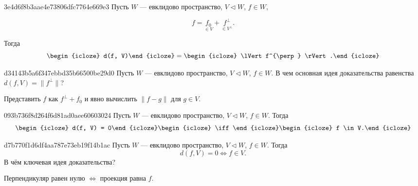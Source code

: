 \begin{note}{3e4d6f8b3aae4e73806dfc7764e669e3}
    Пусть \({ W }\) --- евклидово пространство, \({ V \triangleleft W }\), \({ f \in W }\),
    \begin{icloze}{3}
        \[
            f = \underset{\in V}{f_0} + \underset{\in V^{\perp}}{f^{\perp}}.
        \]
    \end{icloze}
    Тогда
    \[
        \begin{icloze}{2}d(f, V)\end{icloze} = \begin{icloze}{1}\lVert f^{\perp} \rVert.\end{icloze}
    \]
\end{note}

\begin{note}{d34143b5a6f347ebbd35b66500be29d0}
    Пусть \({ W }\) --- евклидово пространство, \({ V \triangleleft W }\), \({ f \in W }\).
    В чем  основная идея доказательства равенства \({ d(f, V) = \lVert f^{\perp} \rVert }\)?

    \begin{cloze}{1}
        Представить \({ f }\) как \({ f^{\perp} + f_0 }\) и явно вычислить \({ \left\lVert f - g \right\rVert }\) для \({ g \in V }\).
    \end{cloze}
\end{note}

\begin{note}{093b736f8d264f6d81ad0aee60603024}
    Пусть \({ W }\) --- евклидово пространство, \({ V \triangleleft W }\), \({ f \in W }\).
    Тогда
    \[
        \begin{icloze}{2}d(f, V) = 0\end{icloze} \begin{icloze}{3}\iff\end{icloze} \begin{icloze}{1}f \in V.\end{icloze}
    \]
\end{note}

\begin{note}{d7b770f1d6df4aa787e73eb19f14b1ac}
    Пусть \({ W }\) --- евклидово пространство, \({ V \triangleleft W }\), \({ f \in W }\).
    Тогда
    \[
        d(f, V) = 0 \iff f \in V.
    \]
    В чём ключевая идея доказательства?

    \begin{cloze}{1}
        Перпендикуляр равен нулю \({ \iff }\) проекция равна \({ f }\).
    \end{cloze}
\end{note}


